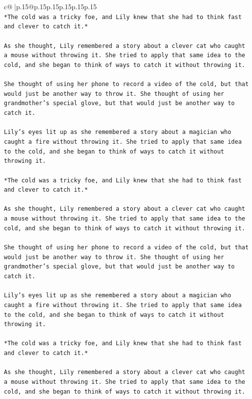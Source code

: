 \documentclass{article}
\begin{document}
{\begin{supertabular}{c@{$\;$}|p{.15\linewidth}@{}p{.15\linewidth}p{.15\linewidth}p{.15\linewidth}p{.15\linewidth}p{.15\linewidth}}
{{{\\ 
\texttt{*The cold was a tricky foe, and Lily knew that she had to think fast and clever to catch it.*} \\
\\ 
\texttt{As she thought, Lily remembered a story about a clever cat who caught a mouse without throwing it. She tried to apply that same idea to the cold, and she began to think of ways to catch it without throwing it.} \\
\\ 
\texttt{She thought of using her phone to record a video of the cold, but that would just be another way to throw it. She thought of using her grandmother's special glove, but that would just be another way to catch it.} \\
\\ 
\texttt{Lily's eyes lit up as she remembered a story about a magician who caught a fire without throwing it. She tried to apply that same idea to the cold, and she began to think of ways to catch it without throwing it.} \\
\\ 
\texttt{*The cold was a tricky foe, and Lily knew that she had to think fast and clever to catch it.*} \\
\\ 
\texttt{As she thought, Lily remembered a story about a clever cat who caught a mouse without throwing it. She tried to apply that same idea to the cold, and she began to think of ways to catch it without throwing it.} \\
\\ 
\texttt{She thought of using her phone to record a video of the cold, but that would just be another way to throw it. She thought of using her grandmother's special glove, but that would just be another way to catch it.} \\
\\ 
\texttt{Lily's eyes lit up as she remembered a story about a magician who caught a fire without throwing it. She tried to apply that same idea to the cold, and she began to think of ways to catch it without throwing it.} \\
\\ 
\texttt{*The cold was a tricky foe, and Lily knew that she had to think fast and clever to catch it.*} \\
\\ 
\texttt{As she thought, Lily remembered a story about a clever cat who caught a mouse without throwing it. She tried to apply that same idea to the cold, and she began to think of ways to catch it without throwing it.} \\
}}}
\end{supertabular}}
\end{document}
